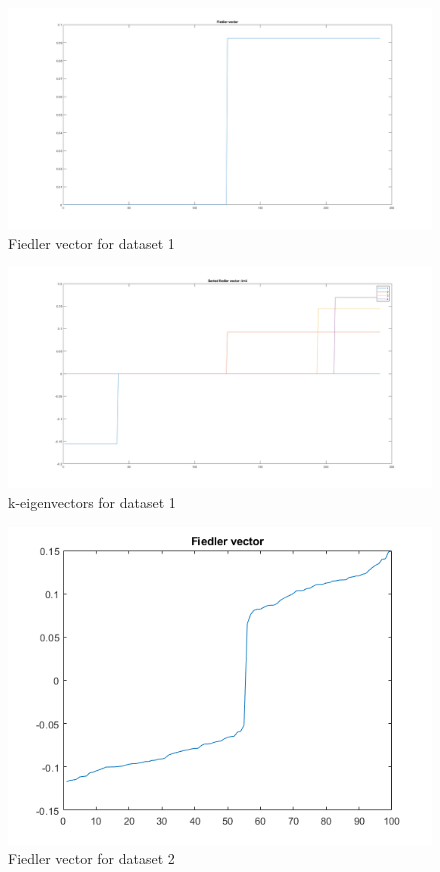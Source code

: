 \documentclass[]{article}
\begin{document}
\begin{figure}[!h]
    \centering
    \includegraphics[width=.8\textwidth]{../example1_fielderVector_2.png}
    \caption{Fiedler vector for dataset 1}
    \label{fig:lpG1}
\end{figure}

\begin{figure}[!h]
    \centering
    \includegraphics[width=.8\textwidth]{../example1_fielderVector.png}
    \caption{k-eigenvectors for dataset 1}
    \label{fig:lpG11}
\end{figure}

\begin{figure}[!h]
    \centering
    \includegraphics[width=.8\textwidth]{../example2_fielderVector_2.png}
    \caption{Fiedler vector for dataset 2}
    \label{fig:lpG2}
\end{figure}
\end{document}
